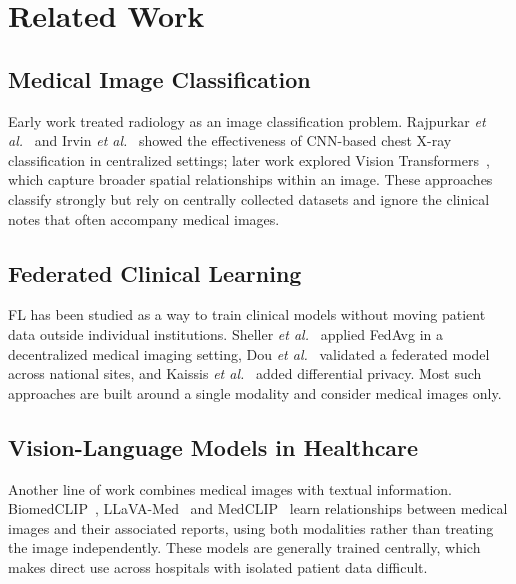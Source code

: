 \documentclass[letterpaper, conference]{IEEEtran}
\begin{document}
\section{Related Work}

\subsection{Medical Image Classification}
Early work treated radiology as an image classification problem. Rajpurkar
\textit{et al.}~\cite{Rajpurkar2017} and Irvin \textit{et al.}~\cite{Irvin2019}
showed the effectiveness of CNN-based chest X-ray classification in centralized
settings; later work explored Vision
Transformers~\cite{Dosovitskiy2021,Liu2021swin}, which capture broader spatial
relationships within an image. These approaches classify strongly but rely on
centrally collected datasets and ignore the clinical notes that often accompany
medical images.

\subsection{Federated Clinical Learning}
FL has been studied as a way to train clinical models without moving patient data
outside individual institutions. Sheller \textit{et al.}~\cite{Sheller2020}
applied FedAvg in a decentralized medical imaging setting, Dou \textit{et
al.}~\cite{Dou2021} validated a federated model across national sites, and
Kaissis \textit{et al.}~\cite{Kaissis2021} added differential privacy. Most such
approaches are built around a single modality and consider medical images only.

\subsection{Vision-Language Models in Healthcare}
Another line of work combines medical images with textual information.
BiomedCLIP~\cite{Zhang2023biomedclip}, LLaVA-Med~\cite{Li2023llavamed} and
MedCLIP~\cite{Wang2022medclip} learn relationships between medical images and
their associated reports, using both modalities rather than treating the image
independently. These models are generally trained centrally, which makes direct
use across hospitals with isolated patient data difficult.
\end{document}
